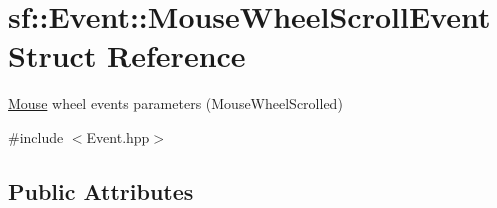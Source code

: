 \hypertarget{structsf_1_1_event_1_1_mouse_wheel_scroll_event}{}\section{sf\+:\+:Event\+:\+:Mouse\+Wheel\+Scroll\+Event Struct Reference}
\label{structsf_1_1_event_1_1_mouse_wheel_scroll_event}


\mbox{\hyperlink{classsf_1_1_mouse}{Mouse}} wheel events parameters (Mouse\+Wheel\+Scrolled)  




{\ttfamily \#include $<$Event.\+hpp$>$}

\subsection*{Public Attributes}
